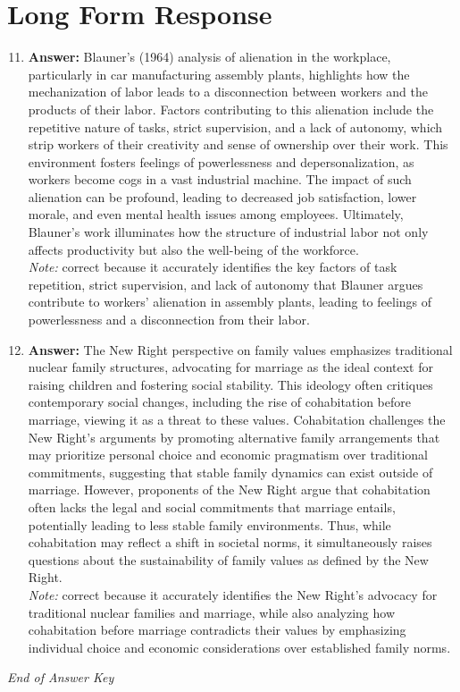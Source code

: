 \documentclass[12pt]{article}
\begin{document}
\section*{Long Form Response}
\begin{enumerate}[label=\arabic*.]
\setcounter{enumi}{10}
\item \textbf{Answer:} Blauner's (1964) analysis of alienation in the workplace, particularly in car manufacturing assembly plants, highlights how the mechanization of labor leads to a disconnection between workers and the products of their labor. Factors contributing to this alienation include the repetitive nature of tasks, strict supervision, and a lack of autonomy, which strip workers of their creativity and sense of ownership over their work. This environment fosters feelings of powerlessness and depersonalization, as workers become cogs in a vast industrial machine. The impact of such alienation can be profound, leading to decreased job satisfaction, lower morale, and even mental health issues among employees. Ultimately, Blauner's work illuminates how the structure of industrial labor not only affects productivity but also the well-being of the workforce.
\\ \textit{Note:} correct because it accurately identifies the key factors of task repetition, strict supervision, and lack of autonomy that Blauner argues contribute to workers' alienation in assembly plants, leading to feelings of powerlessness and a disconnection from their labor.
\item \textbf{Answer:} The New Right perspective on family values emphasizes traditional nuclear family structures, advocating for marriage as the ideal context for raising children and fostering social stability. This ideology often critiques contemporary social changes, including the rise of cohabitation before marriage, viewing it as a threat to these values. Cohabitation challenges the New Right's arguments by promoting alternative family arrangements that may prioritize personal choice and economic pragmatism over traditional commitments, suggesting that stable family dynamics can exist outside of marriage. However, proponents of the New Right argue that cohabitation often lacks the legal and social commitments that marriage entails, potentially leading to less stable family environments. Thus, while cohabitation may reflect a shift in societal norms, it simultaneously raises questions about the sustainability of family values as defined by the New Right.
\\ \textit{Note:} correct because it accurately identifies the New Right's advocacy for traditional nuclear families and marriage, while also analyzing how cohabitation before marriage contradicts their values by emphasizing individual choice and economic considerations over established family norms.
\end{enumerate}

\vfill
\noindent\textit{End of Answer Key}
\end{document}
